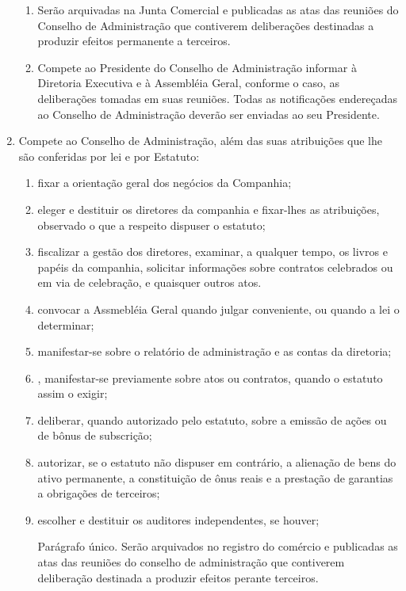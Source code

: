 \documentclass[a4paper,11pt]{report}
\begin{document}
\begin{enumerate}[resume, label=Art. \arabic*]
\begin{enumerate}[label= \S \arabic*]
    \item Serão arquivadas na Junta Comercial e publicadas as atas das reuniões do Conselho de Administração que contiverem deliberações destinadas a produzir efeitos permanente a terceiros.
    \item Compete ao Presidente do Conselho de Administração informar à Diretoria Executiva e à Assembléia Geral, conforme o caso, as deliberações tomadas em suas reuniões. Todas as notificações endereçadas ao Conselho de Administração deverão ser enviadas ao seu Presidente.
\end{enumerate}

\item Compete ao Conselho de Administração, além das suas atribuições que lhe são conferidas por lei e por Estatuto:

\begin{enumerate}[label=\roman*.]
    \item fixar a orientação geral dos negócios da Companhia;
    \item eleger e destituir os diretores da companhia e fixar-lhes as atribuições, observado o que a respeito dispuser o estatuto;
    \item fiscalizar a gestão dos diretores, examinar, a qualquer tempo, os livros e papéis da companhia, solicitar informações sobre contratos celebrados ou em via de celebração, e quaisquer outros atos.
    \item convocar a Assmebléia Geral quando julgar conveniente, ou quando a lei o determinar;
    \item manifestar-se sobre o relatório de administração e as contas da diretoria;
    \item, manifestar-se previamente sobre atos ou contratos, quando o estatuto assim o exigir;
    \item deliberar, quando autorizado pelo estatuto, sobre a emissão de ações ou de bônus de subscrição;
    \item autorizar, se o estatuto não dispuser em contrário, a alienação de bens do ativo permanente, a constituição de ônus reais e a prestação de garantias a obrigações de terceiros;
    \item escolher e destituir os auditores independentes, se houver;
    
    Parágrafo único. Serão arquivados no registro do comércio e publicadas as atas das reuniões do conselho de administração que contiverem deliberação destinada a produzir efeitos perante terceiros.
    

\end{enumerate}
\end{enumerate}
\end{document}
